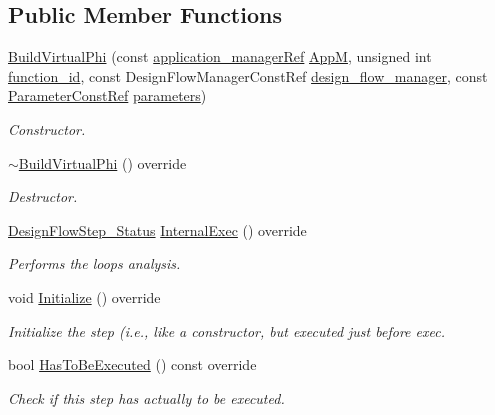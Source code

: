 \subsection*{Public Member Functions}
\begin{DoxyCompactItemize}
\item 
\hyperlink{classBuildVirtualPhi_addcc5010c282ca193036dcbb711a4c70}{Build\+Virtual\+Phi} (const \hyperlink{application__manager_8hpp_a04ccad4e5ee401e8934306672082c180}{application\+\_\+manager\+Ref} \hyperlink{classFrontendFlowStep_a0ac0d8db2a378416583f51c4faa59d15}{AppM}, unsigned int \hyperlink{classFunctionFrontendFlowStep_a58ef2383ad1a212a8d3f396625a4b616}{function\+\_\+id}, const Design\+Flow\+Manager\+Const\+Ref \hyperlink{classDesignFlowStep_ab770677ddf087613add30024e16a5554}{design\+\_\+flow\+\_\+manager}, const \hyperlink{Parameter_8hpp_a37841774a6fcb479b597fdf8955eb4ea}{Parameter\+Const\+Ref} \hyperlink{classDesignFlowStep_a802eaafe8013df706370679d1a436949}{parameters})
\begin{DoxyCompactList}\small\item\em Constructor. \end{DoxyCompactList}\item 
\hyperlink{classBuildVirtualPhi_a76f90cdfd869e945b2a4ee883c02fc2d}{$\sim$\+Build\+Virtual\+Phi} () override
\begin{DoxyCompactList}\small\item\em Destructor. \end{DoxyCompactList}\item 
\hyperlink{design__flow__step_8hpp_afb1f0d73069c26076b8d31dbc8ebecdf}{Design\+Flow\+Step\+\_\+\+Status} \hyperlink{classBuildVirtualPhi_a62df9f8fb288d11ede0f7fa4e61b4f1b}{Internal\+Exec} () override
\begin{DoxyCompactList}\small\item\em Performs the loops analysis. \end{DoxyCompactList}\item 
void \hyperlink{classBuildVirtualPhi_ac9d535c633bc0b4a6f9d9396eaa8d5a5}{Initialize} () override
\begin{DoxyCompactList}\small\item\em Initialize the step (i.\+e., like a constructor, but executed just before exec. \end{DoxyCompactList}\item 
bool \hyperlink{classBuildVirtualPhi_adc93051d46113e21948c8672a0fc4f04}{Has\+To\+Be\+Executed} () const override
\begin{DoxyCompactList}\small\item\em Check if this step has actually to be executed. \end{DoxyCompactList}\item 

\end{DoxyCompactItemize}
